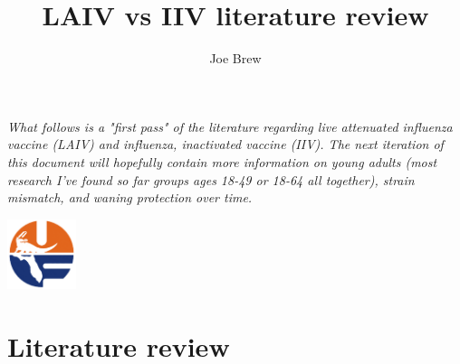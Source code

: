 \documentclass[11pt]{article}
\begin{document}


\title{\textbf{LAIV vs IIV literature review}}
\author{Joe Brew}


\maketitle

\emph{What follows is a "first pass" of the literature regarding live attenuated influenza vaccine (LAIV) and influenza, inactivated vaccine (IIV).  The next iteration of this document will hopefully contain more information on young adults (most research I've found so far groups ages 18-49 or 18-64 all together), strain mismatch, and waning protection over time.}
\tableofcontents

\vspace{20mm}

\begin{center}
\includegraphics[width=2cm]{uf}
\end{center}




\section*{Literature review}
\hrulefill
\end{document}
